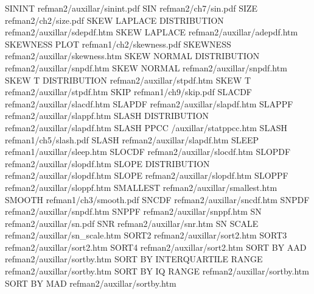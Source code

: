 SININT                                  refman2/auxillar/sinint.pdf
SIN                                     refman2/ch7/sin.pdf
SIZE                                    refman2/ch2/size.pdf
SKEW LAPLACE DISTRIBUTION               refman2/auxillar/sdepdf.htm
SKEW LAPLACE                            refman2/auxillar/adepdf.htm
SKEWNESS PLOT                           refman1/ch2/skewness.pdf
SKEWNESS                                refman2/auxillar/skewness.htm
SKEW NORMAL DISTRIBUTION                refman2/auxillar/snpdf.htm
SKEW NORMAL                             refman2/auxillar/snpdf.htm
SKEW T DISTRIBUTION                     refman2/auxillar/stpdf.htm
SKEW T                                  refman2/auxillar/stpdf.htm
SKIP                                    refman1/ch9/skip.pdf
SLACDF                                  refman2/auxillar/slacdf.htm
SLAPDF                                  refman2/auxillar/slapdf.htm
SLAPPF                                  refman2/auxillar/slappf.htm
SLASH DISTRIBUTION                      refman2/auxillar/slapdf.htm
SLASH PPCC                              /auxillar/statppcc.htm
SLASH                                   refman1/ch5/slash.pdf
SLASH                                   refman2/auxillar/slapdf.htm
SLEEP                                   refman1/auxillar/sleep.htm
SLOCDF                                  refman2/auxillar/slocdf.htm
SLOPDF                                  refman2/auxillar/slopdf.htm
SLOPE DISTRIBUTION                      refman2/auxillar/slopdf.htm
SLOPE                                   refman2/auxillar/slopdf.htm
SLOPPF                                  refman2/auxillar/sloppf.htm
SMALLEST                                refman2/auxillar/smallest.htm
SMOOTH                                  refman1/ch3/smooth.pdf
SNCDF                                   refman2/auxillar/sncdf.htm
SNPDF                                   refman2/auxillar/snpdf.htm
SNPPF                                   refman2/auxillar/snppf.htm
SN                                      refman2/auxillar/sn.pdf
SNR                                     refman2/auxillar/snr.htm
SN SCALE                                refman2/auxillar/sn_scale.htm
SORT2                                   refman2/auxillar/sort2.htm
SORT3                                   refman2/auxillar/sort2.htm
SORT4                                   refman2/auxillar/sort2.htm
SORT BY AAD                             refman2/auxillar/sortby.htm
SORT BY INTERQUARTILE RANGE             refman2/auxillar/sortby.htm
SORT BY IQ RANGE                        refman2/auxillar/sortby.htm
SORT BY MAD                             refman2/auxillar/sortby.htm

